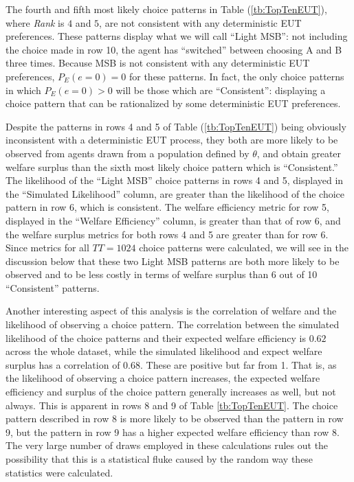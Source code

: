 \documentclass[../main.tex]{subfiles}
\begin{document}
The fourth and fifth most likely choice patterns in Table (\ref{tb:TopTenEUT}), where \textit{Rank} is $4$ and $5$, are not consistent with any deterministic EUT preferences.
These patterns display what we will call \enquote{Light MSB}: not including the choice made in row 10, the agent has \enquote{switched} between choosing A and B three times.{\footnotemark}
Because MSB is not consistent with any deterministic EUT preferences, $P_E(e=0)=0$ for these patterns.
In fact, the only choice patterns in which $P_E(e=0)>0$ will be those which are \enquote{Consistent}: displaying a choice pattern that can be rationalized by some deterministic EUT preferences.

Despite the patterns in rows 4 and 5 of Table (\ref{tb:TopTenEUT}) being obviously inconsistent with a deterministic EUT process, they both are more likely to be observed from agents drawn from a population defined by $\theta$, and obtain greater welfare surplus than the sixth most likely choice pattern which is \enquote{Consistent.}
The likelihood of the \enquote{Light MSB} choice patterns in rows 4 and 5, displayed in the \enquote{Simulated Likelihood} column, are greater than the likelihood of the choice pattern in row 6, which is consistent.
The welfare efficiency metric for row 5, displayed in the \enquote{Welfare Efficiency} column, is greater than that of row 6, and the welfare surplus metrics for both rows 4 and 5 are greater than for row 6.
Since metrics for all $TT = 1024$ choice patterns were calculated, we will see in the discussion below that these two Light MSB patterns are both more likely to be observed and to be less costly in terms of welfare surplus than 6 out of 10 \enquote{Consistent} patterns.

\addtocounter{footnote}{-1}


Another interesting aspect of this analysis is the correlation of welfare and the likelihood of observing a choice pattern.
The correlation between the simulated likelihood of the choice patterns and their expected welfare efficiency is $0.62$ across the whole dataset, while the simulated likelihood and expect welfare surplus has a correlation of $0.68$.
These are positive but far from 1.
That is, as the likelihood of observing a choice pattern increases, the expected welfare efficiency and surplus of the choice pattern generally increases as well, but not always.
This is apparent in rows 8 and 9 of Table \ref{tb:TopTenEUT}.
The choice pattern described in row 8 is more likely to be observed than the pattern in row 9, but the pattern in row 9 has a higher expected welfare efficiency than row 8.
The very large number of draws employed in these calculations rules out the possibility that this is a statistical fluke caused by the random way these statistics were calculated.
\end{document}
